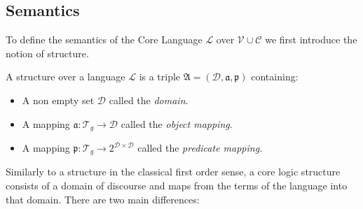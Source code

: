\subsection{Semantics}
To define the semantics of the \nthree Core Language $\mathcal{L}$ over $\mathcal{V}\cup\mathcal{C}$ we first introduce the notion of structure. 

\begin{definition}[Structure]
A structure over a language $\mathcal{L}$ %
is a triple $\mathfrak{A}=(\mathcal{D}, \mathfrak{a}, \mathfrak{p})$ containing:
\begin{itemize}
 \item A non empty set $\mathcal{D}$ %
 called the \emph{domain}. %
 \item A mapping $\mathfrak{a}: \mathcal{T}_g\rightarrow \mathcal{D}$ 
 called the \emph{object mapping}.
 
\item A mapping $\mathfrak{p}: \mathcal{T}_g\rightarrow 2^{\mathcal{D}\times\mathcal{D}}$ called the \emph{predicate mapping}.  %
\end{itemize}
\end{definition}
Similarly to a structure in the classical first order sense, a core logic structure 
consists of a domain of discourse and maps from the terms of the language into that domain. There are two main differences:


